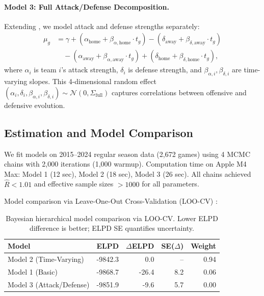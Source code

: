 \paragraph{Model 3: Full Attack/Defense Decomposition.}
Extending \citet{maher1982}, we model attack and defense strengths separately:
\begin{align}\label{eq:bayes-m3}
\mu_g &= \gamma + (\alpha_{\text{home}} + \beta_{\alpha,\text{home}} \cdot t_g) - (\delta_{\text{away}} + \beta_{\delta,\text{away}} \cdot t_g) \nonumber\\
      &\quad - (\alpha_{\text{away}} + \beta_{\alpha,\text{away}} \cdot t_g) + (\delta_{\text{home}} + \beta_{\delta,\text{home}} \cdot t_g),
\end{align}
where $\alpha_i$ is team $i$'s attack strength, $\delta_i$ is defense strength, and $\beta_{\alpha,i}, \beta_{\delta,i}$ are time-varying slopes. This 4-dimensional random effect $(\alpha_i, \delta_i, \beta_{\alpha,i}, \beta_{\delta,i}) \sim \mathcal{N}(0, \Sigma_{\text{full}})$ captures correlations between offensive and defensive evolution.

\subsection{Estimation and Model Comparison}

We fit models on 2015--2024 regular season data (2,672 games) using 4 MCMC chains with 2,000 iterations (1,000 warmup). Computation time on Apple M4 Max: Model 1 (12 sec), Model 2 (18 sec), Model 3 (26 sec). All chains achieved $\hat{R} < 1.01$ and effective sample sizes $> 1000$ for all parameters.

Model comparison via Leave-One-Out Cross-Validation (LOO-CV) \citep{vehtari2017}:
\begin{table}[!ht]
\centering
\caption[Bayesian model comparison]{Bayesian hierarchical model comparison via LOO-CV. Lower ELPD difference is better; ELPD SE quantifies uncertainty.}
\label{tab:bayes-loo}
\begin{tabular}{lrrrr}
\toprule
\textbf{Model}  & \textbf{ELPD}  & \textbf{$\Delta$ELPD}  & \textbf{SE($\Delta$)}  & \textbf{Weight} \\
\midrule
Model 2 (Time-Varying) & -9842.3 & 0.0 & -- & 0.94 \\
Model 1 (Basic) & -9868.7 & -26.4 & 8.2 & 0.06 \\
Model 3 (Attack/Defense) & -9851.9 & -9.6 & 5.7 & 0.00 \\
\bottomrule
\end{tabular}
\end{table}

